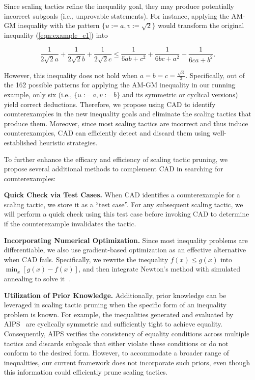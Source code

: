 Since scaling tactics refine the inequality goal, they may produce potentially incorrect subgoals (i.e., unprovable statements). For instance, applying the AM-GM inequality with the pattern $\{u := a, v := \sqrt{2}\}$ would transform the original inequality (\ref{eqn:example_e1}) into
\begin{tcolorbox}[enhanced, colback=black!5!white, colframe=black!75!white, top=2pt, bottom=2pt, left=2pt, right=2pt,] \begin{equation*} \tag{2}
\frac{1}{2\sqrt{2}a}+\frac{1}{2\sqrt{2}b}+\frac{1}{2\sqrt{2}c} \leq \frac{1}{6 a b+c^2}+\frac{1}{6 b c+a^2}+\frac{1}{6 c a+b^2}.
\end{equation*}
\end{tcolorbox}
However, this inequality does not hold when $a = b = c = \frac{\sqrt{3}}{3}$. Specifically, out of the 162 possible patterns for applying the AM-GM inequality in our running example, only six (i.e., $\{u := a, v := b\}$ and its symmetric or cyclical versions) yield correct deductions. Therefore, we propose using CAD to identify counterexamples in the new inequality goals and eliminate the scaling tactics that produce them. Moreover, since most scaling tactics are incorrect and thus induce counterexamples, CAD can efficiently detect and discard them using well-established heuristic strategies.


To further enhance the efficacy and efficiency of scaling tactic pruning, we propose several additional methods to complement CAD in searching for counterexamples:

\textbf{Quick Check via Test Cases. } When CAD identifies a counterexample for a scaling tactic, we store it as a ``test case''. For any subsequent scaling tactic, we will perform a quick check using this test case before invoking CAD to determine if the counterexample invalidates the tactic.

\textbf{Incorporating Numerical Optimization.} Since most inequality problems are differentiable, we also use gradient-based optimization as an effective alternative when CAD fails. Specifically, we rewrite the inequality $f(x) \leq g(x)$ into $\min_x [g(x) - f(x)]$, and then integrate Newton's method with simulated annealing to solve it~\citep{fu2016xsat, ma2019sampling, ni2023solving}.

\textbf{Utilization of Prior Knowledge.} Additionally, prior knowledge can be leveraged in scaling tactic pruning when the specific form of an inequality problem is known. For example, the inequalities generated and evaluated by AIPS~\citep{wei2024proving} are cyclically symmetric and sufficiently tight to achieve equality. Consequently, AIPS verifies the consistency of equality conditions across multiple tactics and discards subgoals that either violate these conditions or do not conform to the desired form. However, to accommodate a broader range of inequalities, our current framework does not incorporate such priors, even though this information could efficiently prune scaling tactics.



